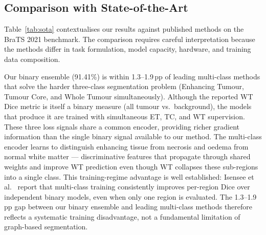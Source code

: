 \documentclass{article}
\begin{document}
\subsection{Comparison with State-of-the-Art}

Table~\ref{tab:sota} contextualises our results against published methods on the
BraTS 2021 benchmark. The comparison requires careful interpretation because the
methods differ in task formulation, model capacity, hardware, and training data
composition.

Our binary ensemble (91.41\%) is within 1.3--1.9\,pp of leading multi-class methods
that solve the harder three-class segmentation problem (Enhancing Tumour, Tumour
Core, and Whole Tumour simultaneously). Although the reported WT Dice metric is
itself a binary measure (all tumour vs.\ background), the models that produce it
are trained with simultaneous ET, TC, and WT supervision. These three loss signals
share a common encoder, providing richer gradient information than the single
binary signal available to our method. The multi-class encoder learns to
distinguish enhancing tissue from necrosis and oedema from normal white matter
--- discriminative features that propagate through shared weights and improve WT
prediction even though WT collapses these sub-regions into a single class. This
training-regime advantage is well established: Isensee et al.\
\cite{isensee2021nnunet} report that multi-class training consistently improves
per-region Dice over independent binary models, even when only one region is
evaluated. The 1.3--1.9\,pp gap between our binary ensemble and leading
multi-class methods therefore reflects a systematic training disadvantage, not a
fundamental limitation of graph-based segmentation.
\end{document}
